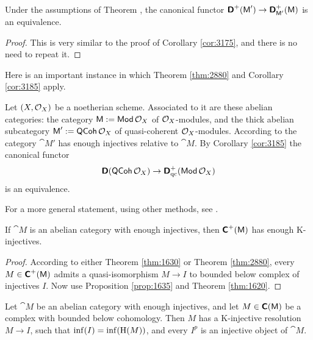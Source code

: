 \begin{cor} \label{cor:3185}
Under the assumptions of Theorem \tup{\ref{thm:2880}}, the canonical functor 
$\boldsymbol{\mathsf{D}}^+(\operatorname{\mathsf{M}}') \to \boldsymbol{\mathsf{D}}^+_{\operatorname{\mathsf{M}}'}(\operatorname{\mathsf{M}})$
is an equivalence. 
\end{cor}

\begin{proof}
This is very similar to the proof of Corollary \ref{cor:3175}, and there is no 
need to repeat it. 
\end{proof}


Here is an important instance in which Theorem \ref{thm:2880} and Corollary 
\ref{cor:3185} apply. 

\begin{exa} \label{exa:2895}
Let $(X, \mathcal{O}_X)$ be a noetherian scheme. Associated to it are these abelian 
categories: the category $\operatorname{\mathsf{M}} := \operatorname{\mathsf{Mod}} \mathcal{O}_X$ of $\mathcal{O}_X$-modules,
and the thick abelian subcategory $\operatorname{\mathsf{M}}' := \operatorname{\mathsf{QCoh}} \mathcal{O}_X$
of quasi-coherent $\mathcal{O}_X$-modules. 
According to \cite[Proposition II.7.6]{RD} the category $\cat{M}'$ has 
enough injectives relative to $\cat{M}$.
By Corollary \ref{cor:3185} the canonical functor
\[ \boldsymbol{\mathsf{D}}(\operatorname{\mathsf{QCoh}} \mathcal{O}_X) \to \boldsymbol{\mathsf{D}}^+_{\mathrm{qc}}(\operatorname{\mathsf{Mod}} \mathcal{O}_X) \]
is an equivalence. 

For a more general statement, using other methods, see 
\cite[Corollary 5.5]{BoNe}. 
\end{exa}

\begin{cor} \label{cor:1630}
If $\cat{M}$ is an abelian category with enough injectives, then  
$\operatorname{\boldsymbol{\mathsf{C}}}^{+}(\operatorname{\mathsf{M}})$ has enough K-injectives. 
\end{cor}

\begin{proof}
According to either Theorem \ref{thm:1630} or Theorem \ref{thm:2880},
every $M \in \operatorname{\boldsymbol{\mathsf{C}}}^{+}(\operatorname{\mathsf{M}})$ admits a quasi-isomorphism $M \to I$
to bounded below complex of injectives $I$. Now use Proposition 
\ref{prop:1635} and Theorem \ref{thm:1620}. 
\end{proof}

\begin{cor} \label{cor:1902}
Let $\cat{M}$ be an abelian category with enough injectives, and let 
$M \in \boldsymbol{\mathsf{C}}(\operatorname{\mathsf{M}})$ be a complex with bounded below cohomology. Then $M$ 
has a K-injective resolution $M \to I$,
such that $\operatorname{inf}(I) = \operatorname{inf}(\operatorname{H}(M))$, 
and every $I^p$ is an injective object of $\cat{M}$. 
\end{cor}


